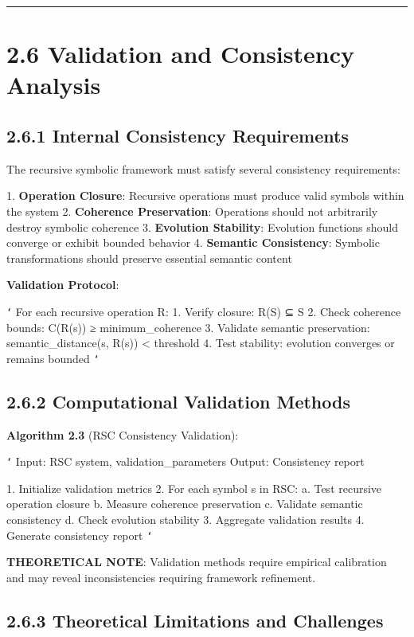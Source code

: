 \hrule

\section{2.6 Validation and Consistency Analysis}

\subsection{2.6.1 Internal Consistency Requirements}

The recursive symbolic framework must satisfy several consistency requirements:

1. \textbf{Operation Closure}: Recursive operations must produce valid symbols within the system
2. \textbf{Coherence Preservation}: Operations should not arbitrarily destroy symbolic coherence
3. \textbf{Evolution Stability}: Evolution functions should converge or exhibit bounded behavior
4. \textbf{Semantic Consistency}: Symbolic transformations should preserve essential semantic content

\textbf{Validation Protocol}:

\texttt{`}
For each recursive operation R:
1. Verify closure: R(S) ⊆ S
2. Check coherence bounds: C(R(s)) ≥ minimum_coherence
3. Validate semantic preservation: semantic_distance(s, R(s)) < threshold
4. Test stability: evolution converges or remains bounded
\texttt{`}

\subsection{2.6.2 Computational Validation Methods}

\textbf{Algorithm 2.3} (RSC Consistency Validation):

\texttt{`}
Input: RSC system, validation_parameters
Output: Consistency report

1. Initialize validation metrics
2. For each symbol s in RSC:
   a. Test recursive operation closure
   b. Measure coherence preservation
   c. Validate semantic consistency
   d. Check evolution stability
3. Aggregate validation results
4. Generate consistency report
\texttt{`}

\textbf{THEORETICAL NOTE}: Validation methods require empirical calibration and may reveal inconsistencies requiring framework refinement.

\subsection{2.6.3 Theoretical Limitations and Challenges}

